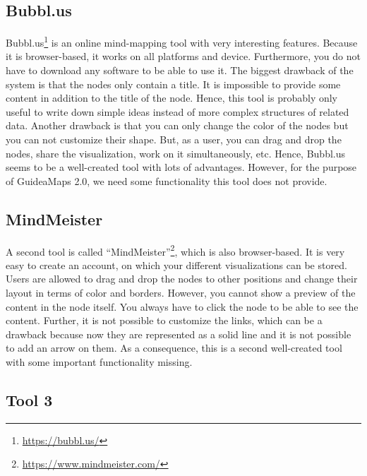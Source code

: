 \subsection{Bubbl.us}
Bubbl.us\footnote{\url{https://bubbl.us/}} is an online mind-mapping tool with very interesting features. Because it is browser-based, it works on all platforms and device. Furthermore, you do not have to download any software to be able to use it. The biggest drawback of the system is that the nodes only contain a title. It is impossible to provide some content in addition to the title of the node. Hence, this tool is probably only useful to write down simple ideas instead of more complex structures of related data. Another drawback is that you can only change the color of the nodes but you can not customize their shape. But, as a user, you can drag and drop the nodes, share the visualization, work on it simultaneously, etc. Hence, Bubbl.us seems to be a well-created tool with lots of advantages. However, for the purpose of GuideaMaps 2.0, we need some functionality this tool does not provide.

\subsection{MindMeister}
A second tool is called ``MindMeister''\footnote{\url{https://www.mindmeister.com/}}, which is also browser-based. It is very easy to create an account, on which your different visualizations can be stored. Users are allowed to drag and drop the nodes to other positions and change their layout in terms of color and borders. However, you cannot show a preview of the content in the node itself. You always have to click the node to be able to see the content. Further, it is not possible to customize the links, which can be a drawback because now they are represented as a solid line and it is not possible to add an arrow on them. As a consequence, this is a second well-created tool with some important functionality missing.

\subsection{Tool 3}





